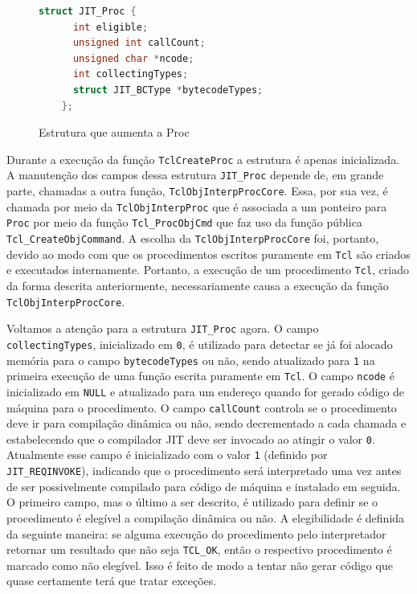 \begin{figure}[h]
  \centering
  \begin{lstlisting}[language=C]
    struct JIT_Proc {
      int eligible;
      unsigned int callCount;
      unsigned char *ncode;
      int collectingTypes;
      struct JIT_BCType *bytecodeTypes;
    };
  \end{lstlisting}
  \caption{\label{jitproc}Estrutura que aumenta a Proc}
\end{figure}

Durante a execução da função \verb!TclCreateProc! a estrutura é apenas
inicializada. A manutenção dos campos dessa estrutura \verb!JIT_Proc!
depende de, em grande parte, chamadas a outra função,
\verb!TclObjInterpProcCore!. Essa,
por sua vez, é chamada por meio da \verb!TclObjInterpProc! que é associada
a um ponteiro para \verb!Proc! por meio da função \verb!Tcl_ProcObjCmd! que
faz uso da função pública \verb!Tcl_CreateObjCommand!. A escolha da
\verb!TclObjInterpProcCore! foi, portanto, devido ao modo com que os
procedimentos escritos puramente em \texttt{Tcl} são criados
e executados internamente.
Portanto, a execução de um procedimento \texttt{Tcl},
criado da forma descrita anteriormente, necessariamente causa a
execução da função \verb!TclObjInterpProcCore!.

Voltamos a atenção para a estrutura \verb!JIT_Proc! agora.
O campo \verb!collectingTypes!, inicializado em \verb!0!, é utilizado para
detectar se já foi alocado memória para o campo \verb!bytecodeTypes!
ou não, sendo atualizado para \verb!1! na primeira execução de uma
função escrita puramente em \texttt{Tcl}. O campo \verb!ncode! é
inicializado em \verb!NULL! e atualizado para um endereço quando for
gerado código de máquina para o procedimento. O campo \verb!callCount!
controla se o procedimento deve ir para compilação dinâmica ou não,
sendo decrementado a cada chamada e estabelecendo que o compilador JIT
deve ser invocado ao atingir
o valor \verb!0!. Atualmente esse campo é inicializado com o valor
\verb!1! (definido por \verb!JIT_REQINVOKE!),
indicando que o procedimento será interpretado uma vez antes
de ser possivelmente compilado para código de máquina e instalado em
seguida. O primeiro
campo, mas o último a ser descrito, é utilizado para definir se o
procedimento é elegível a compilação dinâmica ou não. A elegibilidade
é definida da seguinte maneira: se alguma execução do procedimento pelo
interpretador retornar um resultado que não seja \verb!TCL_OK!, então
o respectivo procedimento é marcado como não elegível. Isso é feito de
modo a tentar não gerar código que quase certamente terá que
tratar exceções.

